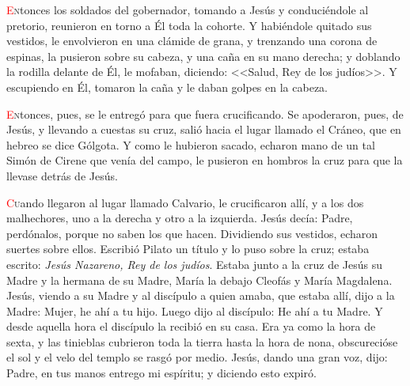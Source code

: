\documentclass[10pt,twoside]{book}
\begin{document}
\vspace{0.5em}



\vspace{1.5em}

\noindent{}
\lettrine[lines=2]{\textcolor{red}{E}}ntonces los soldados del gobernador, tomando a Jesús y conduciéndole al pretorio, reunieron en torno a Él toda la cohorte. 
Y habiéndole quitado sus vestidos, le envolvieron en una clámide de grana, y trenzando una corona de espinas, la pusieron sobre su cabeza, 
y una caña en su mano derecha; y doblando la rodilla delante de Él, le mofaban, diciendo: <<Salud, Rey de los judíos>>. Y escupiendo en Él, 
tomaron la caña y le daban golpes en la cabeza.

\vspace{0.5em}



\vspace{1.5em}

\noindent{}
\lettrine[lines=2]{\textcolor{red}{E}}ntonces, pues, se le entregó para que fuera crucificando. Se apoderaron, pues, de Jesús, y llevando a cuestas su cruz, 
salió hacia el lugar llamado el Cráneo, que en hebreo se dice Gólgota. Y como le hubieron sacado, echaron mano de un tal Simón de Cirene que venía del campo, 
le pusieron en hombros la cruz para que la llevase detrás de Jesús.

\vspace{0.5em}



\vspace{1.5em}

\noindent{}
\lettrine[lines=2]{\textcolor{red}{C}}uando llegaron al lugar llamado Calvario, le crucificaron allí, y a los dos malhechores, uno a la derecha y otro a la izquierda. 
Jesús decía: Padre, perdónalos, porque no saben los que hacen. Dividiendo sus vestidos, echaron suertes sobre ellos. Escribió Pilato un título y lo puso sobre la cruz;
estaba escrito: \textit{Jesús Nazareno, Rey de los judíos}. Estaba junto a la cruz de Jesús su Madre y la hermana de su Madre, María la debajo Cleofás y María Magdalena.
Jesús, viendo a su Madre y al discípulo a quien amaba, que estaba allí, dijo a la Madre: Mujer, he ahí a tu hijo. Luego dijo al discípulo: He ahí a tu Madre.
Y desde aquella hora el discípulo la recibió en su casa. Era ya como la hora de sexta, y las tinieblas cubrieron toda la tierra hasta la hora de nona,
obscurecióse el sol y el velo del templo se rasgó por medio. Jesús, dando una gran voz, dijo: Padre, en tus manos entrego mi espíritu; y diciendo esto expiró.
\end{document}
